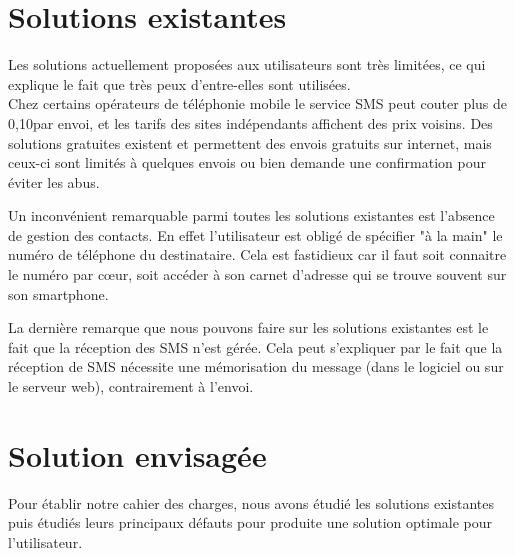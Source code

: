 \section{Solutions existantes}

Les solutions actuellement proposées aux utilisateurs sont très limitées, ce qui explique le fait que très peux d'entre-elles sont utilisées.
\\


Chez certains opérateurs de téléphonie mobile le service SMS peut couter plus de 0,10\texteuro par envoi, et les tarifs des sites indépendants affichent des prix voisins.
Des solutions gratuites existent et permettent des envois gratuits sur internet, mais ceux-ci sont limités à quelques envois ou bien demande une confirmation pour éviter les abus.

Un inconvénient remarquable parmi toutes les solutions existantes est l'absence de gestion des contacts.
En effet l'utilisateur est obligé de spécifier "à la main" le numéro de téléphone du destinataire.
Cela est fastidieux car il faut soit connaitre le numéro par cœur, soit accéder à son carnet d'adresse qui se trouve souvent sur son smartphone.

La dernière remarque que nous pouvons faire sur les solutions existantes est le fait que la réception des SMS n'est gérée.
Cela peut s'expliquer par le fait que la réception de SMS nécessite une mémorisation du message (dans le logiciel ou sur le serveur web), contrairement à l'envoi.






\section{Solution envisagée}

Pour établir notre cahier des charges, nous avons étudié les solutions existantes puis étudiés leurs principaux défauts pour produite une solution optimale pour l'utilisateur.
\\



